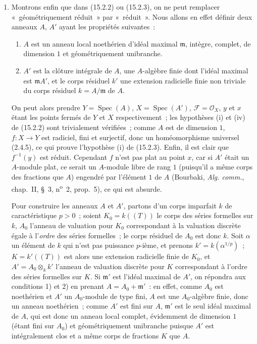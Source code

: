 \begin{remarks}[15.2.4]
\begin{enumerate}[label=(\roman*)]
  \item Montrons enfin que dans (15.2.2) ou (15.2.3), on ne peut remplacer
  «~géométriquement réduit~» par «~réduit~». Nous allons en effet définir deux
  anneaux $A$, $A'$ ayant les propriétés suivantes~:
  \begin{enumerate}[label=\arabic*)]
    \item $A$ est un anneau local noethérien d'idéal maximal $\mathfrak m$,
    intègre, complet, de dimension $1$ et géométriquement unibranche.
    \item $A'$ est la clôture intégrale de $A$, une $A$-algèbre finie dont
    l'idéal maximal est $\mathfrak mA'$, et le corps résiduel $k'$ une extension
    radicielle finie non triviale du corps résiduel $k=A/\mathfrak m$ de $A$.
  \end{enumerate}
  On peut alors prendre $Y=\operatorname{Spec}(A)$,
  $X=\operatorname{Spec}(A')$, $\mathcal F=\mathcal O_X$, $y$ et $x$ étant les
  points fermés de $Y$ et $X$ respectivement~; les hypothèses (i) et (iv) de
  (15.2.2) sont trivialement vérifiées~; comme $A$ est de dimension $1$,
  $f:X\to Y$ est radiciel, fini et surjectif, donc un homéomorphisme universel
  (2.4.5), ce qui prouve l'hypothèse (i) de (15.2.3). Enfin, il est clair que
  $f^{-1}(y)$ est réduit. Cependant $f$ n'est pas plat au point $x$, car si $A'$
  était un $A$-module plat, ce serait un $A$-module libre de rang $1$ (puisqu'il
  a même corps des fractions que $A$) engendré par l'élément $1$ de $A$
  (Bourbaki, \emph{Alg. comm.}, chap.~II, \S~3, n\textsuperscript{o}~2,
  prop.~5), ce qui est absurde.

  Pour construire les anneaux $A$ et $A'$, partons d'un corps imparfait $k$ de
  caractéristique $p>0$~; soient $K_0=k((T))$ le corps des séries formelles sur
  $k$, $A_0$ l'anneau de valuation pour $K_0$ correspondant à la valuation
  discrète égale à l'\emph{ordre} des séries formelles~; le corps résiduel de
  $A_0$ est donc $k$. Soit $\alpha$ un élément de $k$ qui n'est pas puissance
  $p$-ième, et prenons $k'=k(\alpha^{1/p})$~; $K=k'((T))$ est alors une extension
  radicielle finie de $K_0$, et $A'=A_0\otimes_k k'$ l'anneau de valuation
  discrète pour $K$ correspondant à l'ordre des séries formelles sur $K$. Si
  $\mathfrak m'$ est l'idéal maximal de $A'$, on répondra aux conditions 1) et 2)
  en prenant $A=A_0+\mathfrak m'$~: en effet, comme $A_0$ est noethérien et $A'$
  un $A_0$-module de type fini, $A$ est une $A_0$-algèbre finie, donc un anneau
  noethérien~; comme $A'$ est fini sur $A$, $\mathfrak m'$ est le seul idéal
  maximal de $A$, qui est donc un anneau local complet, évidemment de dimension
  $1$ (étant fini sur $A_0$) et géométriquement unibranche puisque $A'$ est
  intégralement clos et a même corps de fractions $K$ que $A$.


\end{enumerate}
\end{remarks}
